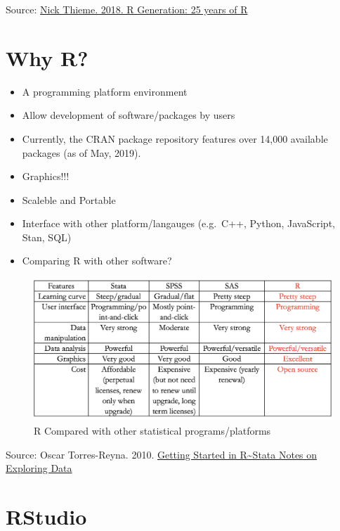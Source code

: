 \documentclass[]{book}
\providecommand{\tightlist}{%
  \setlength{\itemsep}{0pt}\setlength{\parskip}{0pt}}
\begin{document}
Source: \href{https://rss.onlinelibrary.wiley.com/doi/10.1111/j.1740-9713.2018.01169.x}{Nick Thieme. 2018. R Generation: 25 years of R}

\hypertarget{why-r}{%
\section{Why R?}\label{why-r}}

\begin{itemize}
\tightlist
\item
  A programming platform environment
\item
  Allow development of software/packages by users
\item
  Currently, the CRAN package repository features over 14,000 available packages (as of May, 2019).
\item
  Graphics!!!
\item
  Scaleble and Portable
\item
  Interface with other platform/langauges (e.g.~C++, Python, JavaScript, Stan, SQL)
\item
  Comparing R with other software?
\end{itemize}

\begin{figure}
\includegraphics[width=1\linewidth]{Rcompare} \caption{R Compared with other statistical programs/platforms}\label{fig:Rcompare}
\end{figure}

Source: Oscar Torres-Reyna. 2010. \href{https://dss.princeton.edu/training/RStata.pdf}{Getting Started in R\textasciitilde Stata Notes on Exploring Data}

\hypertarget{rstudio}{%
\section{RStudio}\label{rstudio}}
\end{document}
